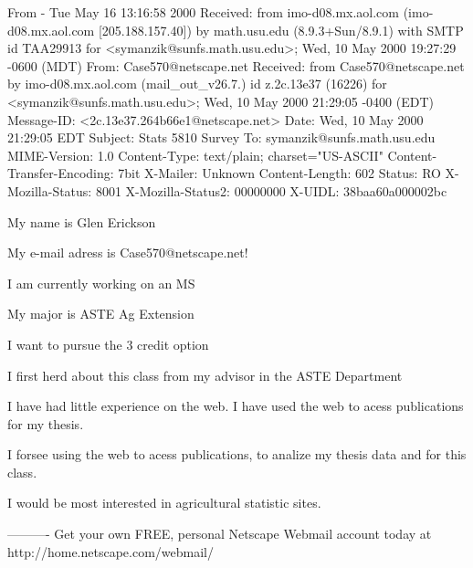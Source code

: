 From - Tue May 16 13:16:58 2000
Received: from imo-d08.mx.aol.com (imo-d08.mx.aol.com [205.188.157.40])
	by math.usu.edu (8.9.3+Sun/8.9.1) with SMTP id TAA29913
	for <symanzik@sunfs.math.usu.edu>; Wed, 10 May 2000 19:27:29 -0600 (MDT)
From: Case570@netscape.net
Received: from Case570@netscape.net
	by imo-d08.mx.aol.com (mail_out_v26.7.) id z.2c.13e37 (16226)
	 for <symanzik@sunfs.math.usu.edu>; Wed, 10 May 2000 21:29:05 -0400 (EDT)
Message-ID: <2c.13e37.264b66e1@netscape.net>
Date: Wed, 10 May 2000 21:29:05 EDT
Subject:  Stats 5810 Survey
To: symanzik@sunfs.math.usu.edu
MIME-Version: 1.0
Content-Type: text/plain; charset="US-ASCII"
Content-Transfer-Encoding: 7bit
X-Mailer: Unknown
Content-Length: 602
Status: RO
X-Mozilla-Status: 8001
X-Mozilla-Status2: 00000000
X-UIDL: 38baa60a000002bc

My name is Glen Erickson

My e-mail adress is Case570@netscape.net!

I am currently working on an MS

My major is ASTE Ag Extension

I want to pursue the 3 credit option

I first herd about this class from my advisor in the ASTE Department

I have had little experience on the web.  I have used the web to acess publications for my thesis.

I forsee using the web to acess publications, to analize my thesis data and for this class.

I would be most interested in agricultural statistic sites.

----------
Get your own FREE, personal Netscape Webmail account today at http://home.netscape.com/webmail/
